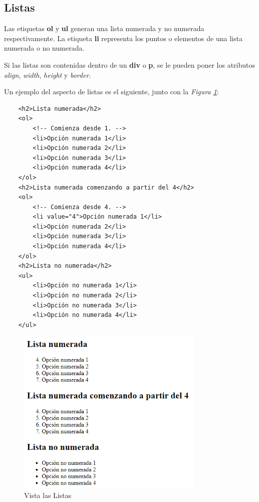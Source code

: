 \subsection{Listas}
\hspace{0.55cm}Las etiquetas \textbf{ol} y \textbf{ul} generan una lista numerada y no numerada respectivamente. La etiqueta \textbf{li} representa los puntos o elementos de una lista numerada o no numerada.

Si las listas son contenidas dentro de un \textbf{div} o \textbf{p}, se le pueden poner los atributos \textit{align}, \textit{width}, \textit{height} y \textit{border}.

Un ejemplo del aspecto de listas es el siguiente, junto con la \textit{Figura \ref{fig: 4}}:
\begin{lstlisting}
    <h2>Lista numerada</h2>
    <ol>
        <!-- Comienza desde 1. -->
        <li>Opción numerada 1</li>
        <li>Opción numerada 2</li>
        <li>Opción numerada 3</li>
        <li>Opción numerada 4</li>
    </ol>
    <h2>Lista numerada comenzando a partir del 4</h2>
    <ol>
        <!-- Comienza desde 4. -->
        <li value="4">Opción numerada 1</li>
        <li>Opción numerada 2</li>
        <li>Opción numerada 3</li>
        <li>Opción numerada 4</li>
    </ol>
    <h2>Lista no numerada</h2>
    <ul>
        <li>Opción no numerada 1</li>
        <li>Opción no numerada 2</li>
        <li>Opción no numerada 3</li>
        <li>Opción no numerada 4</li>
    </ul>
\end{lstlisting}
\begin{figure}[H]
    \centering
    \caption{Vista las Listas}
    \label{fig: 4}
    \includegraphics[height=8cm]{ss_html/listas.png}
\end{figure}

